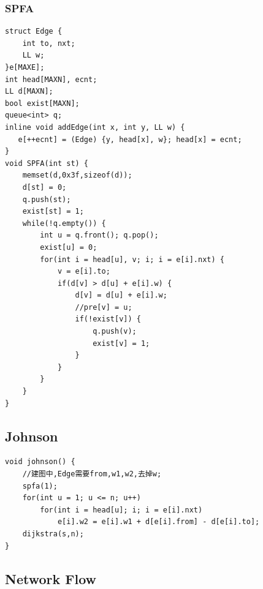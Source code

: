 \documentclass[10pt]{ctexart}
\begin{document}
{\subsubsection{SPFA}
\begin{lstlisting}
struct Edge {
    int to, nxt;
    LL w;
}e[MAXE];
int head[MAXN], ecnt;
LL d[MAXN];
bool exist[MAXN];
queue<int> q;
inline void addEdge(int x, int y, LL w) {
   e[++ecnt] = (Edge) {y, head[x], w}; head[x] = ecnt;
}
void SPFA(int st) {
    memset(d,0x3f,sizeof(d));
    d[st] = 0;
    q.push(st);
    exist[st] = 1;
    while(!q.empty()) {
        int u = q.front(); q.pop();
        exist[u] = 0;
        for(int i = head[u], v; i; i = e[i].nxt) {
            v = e[i].to;
            if(d[v] > d[u] + e[i].w) {
                d[v] = d[u] + e[i].w;
                //pre[v] = u;
                if(!exist[v]) {
                    q.push(v);
                    exist[v] = 1;
                }
            }
        }
    }
}
\end{lstlisting}
\subsection{Johnson}
\begin{lstlisting}
void johnson() {
    //建图中,Edge需要from,w1,w2,去掉w;
    spfa(1);
    for(int u = 1; u <= n; u++) 
        for(int i = head[u]; i; i = e[i].nxt)
            e[i].w2 = e[i].w1 + d[e[i].from] - d[e[i].to]; 
    dijkstra(s,n);
}
\end{lstlisting}
\subsection{Network Flow}
}
\end{document}
